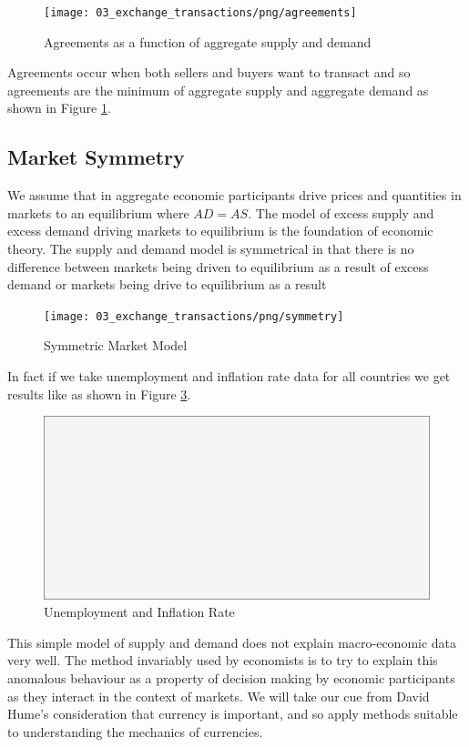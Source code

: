 \begin{figure}[H]
\centering
\texttt{[image: 03\_exchange\_transactions/png/agreements]}
\caption{Agreements as a function of aggregate supply and demand}
\label{fig:agreements}
\end{figure}

Agreements occur when both sellers and buyers want to transact and so agreements are the minimum of
aggregate supply and aggregate demand as shown in Figure \ref{fig:agreements}.

\subsection{Market Symmetry}

We assume that in aggregate economic participants drive prices and quantities in markets to an
equilibrium where $AD = AS$. The model of excess supply and excess demand driving markets to
equilibrium is the foundation of economic theory. The supply and demand model is symmetrical in that
there is no difference between markets being driven to equilibrium as a result of excess demand or
markets being drive to equilibrium as a result  

\begin{figure}[H]
\centering
\texttt{[image: 03\_exchange\_transactions/png/symmetry]}
\caption{Symmetric Market Model}
\label{fig:symmetric_market_model}
\end{figure}

In fact if we take unemployment and inflation rate data for all countries we get results like as
shown in Figure \ref{fig:ui_summary}.

\begin{figure}[H]
\centering
\includegraphics[scale=0.48]{blank}
\caption{Unemployment and Inflation Rate}
\label{fig:ui_summary}
\end{figure}

This simple model of supply and demand does not explain macro-economic data very well. The method
invariably used by economists is to try to explain this anomalous behaviour as a property of
decision making by economic participants as they interact in the context of markets. We will take
our cue from David Hume's consideration that currency is important, and so apply methods suitable to
understanding the mechanics of currencies.


